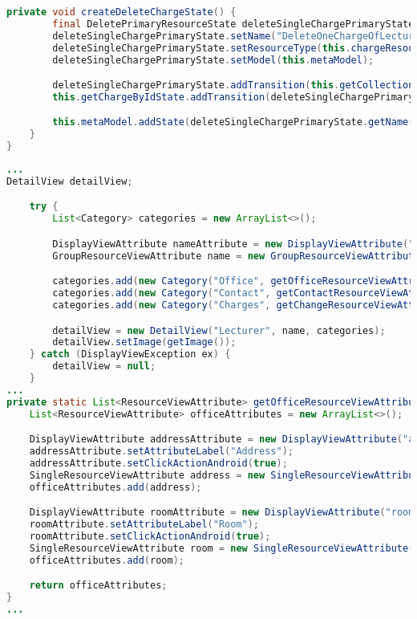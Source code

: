 \begin{lstlisting}[label=lst:enfield_model,
language=java,
firstnumber=1,
caption=Beschreibung des \textit{Enfield-Modell} der Referenzimplementierung. ]
	private void createDeleteChargeState() {
		final DeletePrimaryResourceState deleteSingleChargePrimaryState = new DeletePrimaryResourceState();
		deleteSingleChargePrimaryState.setName("DeleteOneChargeOfLecturer");
		deleteSingleChargePrimaryState.setResourceType(this.chargeResource);
		deleteSingleChargePrimaryState.setModel(this.metaModel);

		deleteSingleChargePrimaryState.addTransition(this.getCollectionOfChargesState, "getAllCharges");
		this.getChargeByIdState.addTransition(deleteSingleChargePrimaryState, "deleteCharge");

		this.metaModel.addState(deleteSingleChargePrimaryState.getName(), deleteSingleChargePrimaryState);
	}
}
\end{lstlisting}

\newpage

\begin{lstlisting}[label=lst:detailview_impl,
language=java,
firstnumber=1,
caption=Erstellung einer \textit{DetailView}.]				   
...
DetailView detailView;

	try {
		List<Category> categories = new ArrayList<>();

		DisplayViewAttribute nameAttribute = new DisplayViewAttribute("name", ViewAttribute.AttributeType.TEXT);
		GroupResourceViewAttribute name = new GroupResourceViewAttribute(nameAttribute, getViewTitleAttributes());

		categories.add(new Category("Office", getOfficeResourceViewAttributes()));
		categories.add(new Category("Contact", getContactResourceViewAttributes()));
		categories.add(new Category("Charges", getChangeResourceViewAttributes()));

		detailView = new DetailView("Lecturer", name, categories);
		detailView.setImage(getImage());
	} catch (DisplayViewException ex) {
		detailView = null;
	}
...
private static List<ResourceViewAttribute> getOfficeResourceViewAttributes() {
	List<ResourceViewAttribute> officeAttributes = new ArrayList<>();

	DisplayViewAttribute addressAttribute = new DisplayViewAttribute("address", ViewAttribute.AttributeType.LOCATION);
	addressAttribute.setAttributeLabel("Address");
	addressAttribute.setClickActionAndroid(true);
	SingleResourceViewAttribute address = new SingleResourceViewAttribute(addressAttribute);
	officeAttributes.add(address);

	DisplayViewAttribute roomAttribute = new DisplayViewAttribute("roomNumber", ViewAttribute.AttributeType.TEXT);
	roomAttribute.setAttributeLabel("Room");
	roomAttribute.setClickActionAndroid(true);
	SingleResourceViewAttribute room = new SingleResourceViewAttribute(roomAttribute);
	officeAttributes.add(room);

	return officeAttributes;
}
...
\end{lstlisting}

